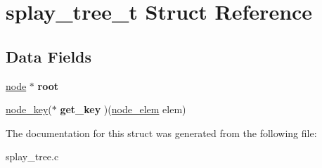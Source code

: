 \hypertarget{structsplay__tree__t}{}\section{splay\+\_\+tree\+\_\+t Struct Reference}
\label{structsplay__tree__t}
\subsection*{Data Fields}
\begin{DoxyCompactItemize}
\item 
\hypertarget{structsplay__tree__t_aa570215f2f913275d6ff0d586e436d21}{}\hyperlink{structnode__t}{node} $\ast$ {\bfseries root}\label{structsplay__tree__t_aa570215f2f913275d6ff0d586e436d21}

\item 
\hypertarget{structsplay__tree__t_aaf8bcc7f18b38c4e4ec1663c7589dd56}{}\hyperlink{splay__tree_8h_adcfee39dc0f7f5e13313c7413093d98b}{node\+\_\+key}($\ast$ {\bfseries get\+\_\+key} )(\hyperlink{splay__tree_8h_a63ae18d1e62ef66f2b7e5e76cd04a27f}{node\+\_\+elem} elem)\label{structsplay__tree__t_aaf8bcc7f18b38c4e4ec1663c7589dd56}

\end{DoxyCompactItemize}


The documentation for this struct was generated from the following file\+:\begin{DoxyCompactItemize}
\item 
splay\+\_\+tree.\+c\end{DoxyCompactItemize}
